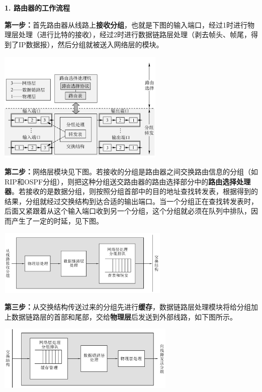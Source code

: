 {\textbf{{1. 路由器的工作流程}}}

\textbf{第一步：}首先路由器从线路上\textbf{接收分组}，也就是下图的输入端口，经过1时进行物理层处理（进行比特的接收），经过2时进行数据链路层处理（剥去帧头、帧尾，得到了IP数据报），{然后分组就被送入网络层的模块。}

\includegraphics[width=3.12500in,height=2.09375in]{png-jpeg-pics/B52FB1366D26652412C2F046A7D7E815.png}

{\textbf{第二步：}网络层模块见下图。若接收的分组是路由器之间交换路由信息的分组（如RIP和OSPF分组），则把这种分组送交路由器的路由选择部分中的}\textbf{路由选择处理器}{。若接收的是数据分组，则按照分组首部中的目的地址查找转发表，根据得到的结果，分组就经过交换结构到达合适的输出端口。当一个分组正在查找转发表时，后面又紧跟着从这个输入端口收到另一个分组，这个分组就必须在队列中排队，因而产生了一定的时延，见下图。}

\includegraphics[width=3.22917in,height=1.23958in]{png-jpeg-pics/E3D6CF6678B98A1A530712098CF0A617.png}

\textbf{第三步：}从交换结构传送过来的分组先进行\textbf{缓存}，数据链路层处理模块将给分组加上数据链路层的首部和尾部，交给\textbf{物理层}后发送到外部线路，如下图所示。

\includegraphics[width=3.33333in,height=1.22917in]{png-jpeg-pics/86F764DD73A55B076A43A7E0DAA6F103.png}
